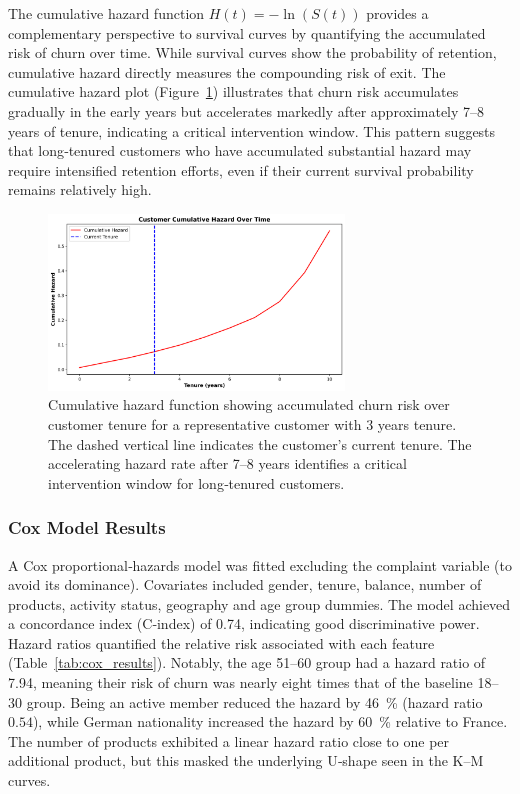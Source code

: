 \documentclass[12pt]{article}
\begin{document}
The cumulative hazard function \(H(t) = -\ln(S(t))\) provides a complementary perspective to survival curves by quantifying the accumulated risk of churn over time.  While survival curves show the probability of retention, cumulative hazard directly measures the compounding risk of exit.  The cumulative hazard plot (Figure~\ref{fig:cumulative_hazard}) illustrates that churn risk accumulates gradually in the early years but accelerates markedly after approximately 7–8 years of tenure, indicating a critical intervention window.  This pattern suggests that long‑tenured customers who have accumulated substantial hazard may require intensified retention efforts, even if their current survival probability remains relatively high.

\begin{figure}[H]
\centering
\includegraphics[width=0.7\textwidth]{img/cumulative_hazard_plot.png}
\caption{Cumulative hazard function showing accumulated churn risk over customer tenure for a representative customer with 3 years tenure. The dashed vertical line indicates the customer's current tenure. The accelerating hazard rate after 7–8 years identifies a critical intervention window for long‑tenured customers.}
\label{fig:cumulative_hazard}
\end{figure}

\subsubsection{Cox Model Results}
A Cox proportional‑hazards model was fitted excluding the complaint variable (to avoid its dominance).  Covariates included gender, tenure, balance, number of products, activity status, geography and age group dummies.  The model achieved a concordance index (C‑index) of 0.74, indicating good discriminative power.  Hazard ratios quantified the relative risk associated with each feature (Table~\ref{tab:cox_results}).  Notably, the age 51–60 group had a hazard ratio of 7.94, meaning their risk of churn was nearly eight times that of the baseline 18–30 group.  Being an active member reduced the hazard by 46~\% (hazard ratio \(0.54\)), while German nationality increased the hazard by 60~\% relative to France.  The number of products exhibited a linear hazard ratio close to one per additional product, but this masked the underlying U‑shape seen in the K–M curves.
\end{document}
